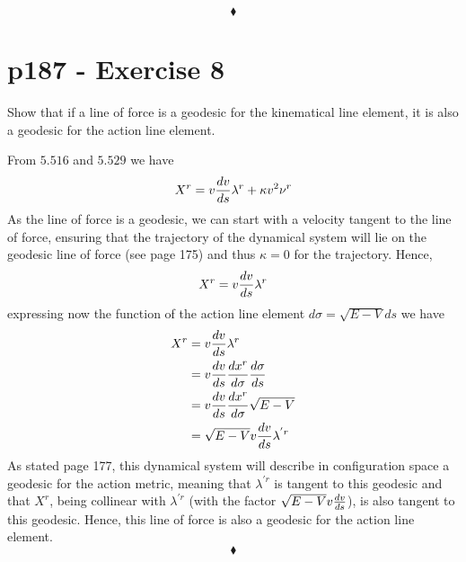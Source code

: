 $$\blacklozenge$$
\newpage


\section{p187 - Exercise 8}
\begin{tcolorbox}
Show that if a line of force is a geodesic         for the kinematical line element, it is also a geodesic for the action line element.
\end{tcolorbox}
From $\mathbf{5.516}$ and  $\mathbf{5.529}$ we have
\begin{align}
X^r = v\dv{v}{s}\lambda^r +\kappa v^2\nu^r
\end{align}
As the line of force is a geodesic, we can start with a velocity tangent to the line of force, ensuring that the trajectory of the dynamical system will lie on the geodesic line of force (see page 175) and thus $\kappa=0$ for the trajectory. Hence,
\begin{align}
X^r = v\dv{v}{s}\lambda^r
\end{align}
expressing now the function of the action line element $d \sigma = \sqrt{E-V}ds $ we have 
\begin{align}
X^r &= v\dv{v}{s}\lambda^r\\
&= v\dv{v}{s}\dv{x^r}{\sigma}\dv{\sigma}{s}\\
&= v\dv{v}{s}\dv{x^r}{\sigma}\sqrt{E-V}\\
&= \sqrt{E-V}v\dv{v}{s}\lambda^{'r}
\end{align}
As stated page 177, this dynamical system will describe in configuration space a geodesic for the action metric, meaning that $\lambda^{'r}$ is tangent to this geodesic and that $X^r$, being collinear with $\lambda^{'r}$ (with the factor $\sqrt{E-V}v\dv{v}{s}$), is also tangent to this geodesic. Hence, this  line of force is also a geodesic for the action line element.
$$\blacklozenge$$
\newpage

